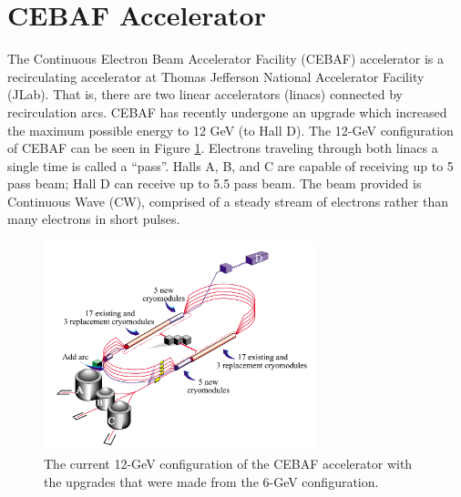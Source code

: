\section{CEBAF Accelerator}

The Continuous Electron Beam Accelerator Facility (CEBAF) accelerator is a recirculating accelerator at Thomas Jefferson National Accelerator Facility (JLab). That is, there are two linear accelerators (linacs) connected by recirculation arcs. CEBAF has recently undergone an upgrade which increased the maximum possible energy to 12 GeV (to Hall D). The 12-GeV configuration of CEBAF can be seen in Figure \ref{fig:cebaf}. Electrons traveling through both linacs a single time is called a ``pass''. Halls A, B, and C are capable of receiving up to 5 pass beam; Hall D can receive up to 5.5 pass beam. The beam provided is Continuous Wave (CW), comprised of a steady stream of electrons rather than many electrons in short pulses.

\begin{figure}[h]
\begin{center}
\includegraphics[width=0.7\textwidth]{./setup/fig/cebaf.png}
\caption{The current 12-GeV configuration of the CEBAF accelerator with the upgrades that were made from the 6-GeV configuration.\cite{12gevWP}}
\label{fig:cebaf}
\end{center}
\end{figure}

